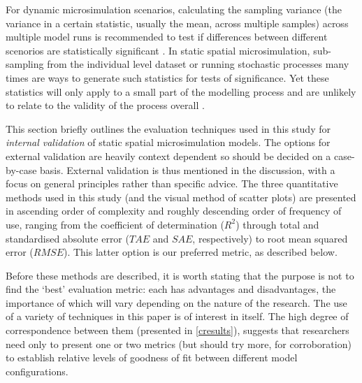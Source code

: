 \documentclass[a4paper,10pt]{article}
\begin{document}
For dynamic microsimulation scenarios,
calculating the sampling variance (the variance
in a certain statistic, usually the mean, across multiple samples)
across multiple model runs
is recommended to test if differences between different
scenorios are statistically significant \citep{goedeme2013testing}.
In static spatial
microsimulation, sub-sampling
from the individual level dataset or running stochastic processes
many times are ways to generate such statistics for tests
of significance. Yet these statistics will only apply to a small part
of the modelling process and are unlikely to relate to
the validity of the process overall \citep{Lovelace2013-trs}.

This section briefly outlines the evaluation techniques
used in this study for \emph{internal validation}
of static spatial microsimulation models.
The options for external
validation are heavily context dependent so should be decided on a
case-by-case basis.
External validation is thus mentioned in the discussion,
with a focus on general principles
rather than specific advice. The three quantitative
methods used in this study (and the visual method of scatter plots)
are presented in ascending order of complexity
and roughly descending order of frequency of use, ranging from 
the coefficient of determination ($R^2$) through total and standardised
absolute error ($TAE$ and $SAE$, respectively)
to root mean squared error ($RMSE$).
This latter option is our preferred metric, as described below.

Before these methods are described, it is
worth stating that the purpose is not to find the `best' evaluation metric:
each has advantages and disadvantages, the importance of which will vary depending on the
nature of the research. The use of a variety of techniques in this paper
is of interest in itself. The high degree of correspondence between them (presented in \cref{cresults}),
suggests that researchers need only to present one or two metrics (but should
try more, for corroboration)
to establish relative levels of goodness of fit between
different model configurations.
\end{document}
